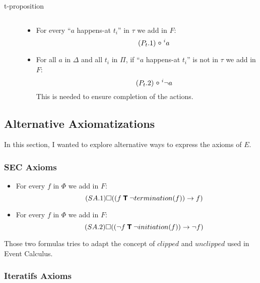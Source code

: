 \begin{description}
\begin{itemize}
\begin{equation}
    \end{equation}
  \end{itemize}
  \item[t-proposition] $ $
  \begin{itemize}
    \item For every “$a$ happens-at $t_i$” in $\tau$ we add in $F$:
    \begin{equation}\tag{$P_t.1$}
      \next^{i}a
    \end{equation}\label{sec:trans_def_ltl}
    \item For all $a$ in $\Delta$ and all $t_i$ in $\Pi$, if “$a$ happens-at $t_i$” is not in $\tau$ we add in $F$:
    \begin{equation}\tag{$P_t.2$}
      \next^{i}\neg a
    \end{equation}
      This is needed to ensure completion of the actions.
  \end{itemize}
\end{description}

\subsection{Alternative Axiomatizations}

In this section, I wanted to explore alternative ways to express the axioms of $E$.

\subsubsection{SEC Axioms}\label{sec:sec}

\begin{itemize}
  \item
    For every $f$ in $\Phi$ we add in $F$:
    \begin{equation}\tag{$SA.1$}
      \square((f \mathbin{\bm{\mathsf{T}}} \neg termination(f)) \rightarrow f)
    \end{equation}
  \item
    For every $f$ in $\Phi$ we add in $F$:
    \begin{equation}\tag{$SA.2$}
      \square((\neg f \mathbin{\bm{\mathsf{T}}} \neg initiation(f)) \rightarrow \neg f)
    \end{equation}
\end{itemize}

Those two formulas tries to adapt the concept of $clipped$ and $unclipped$ used in Event Calculus.

\subsubsection{Iteratifs Axioms}

